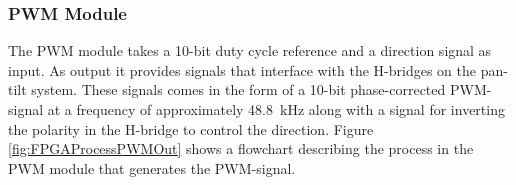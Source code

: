 \documentclass[../../main.tex]{subfiles}
\begin{document}


    


\subsubsection*{PWM Module}
The PWM module takes a 10-bit duty cycle reference and a direction signal as input. As output it provides signals that interface with the H-bridges on the pan-tilt system. These signals comes in the form of a 10-bit phase-corrected PWM-signal at a frequency of approximately \SI{48.8}{\kilo \hertz} along with a signal for inverting the polarity in the H-bridge to control the direction. Figure \ref{fig:FPGAProcessPWMOut} shows a flowchart describing the process in the PWM module that generates the PWM-signal.
\end{document}
